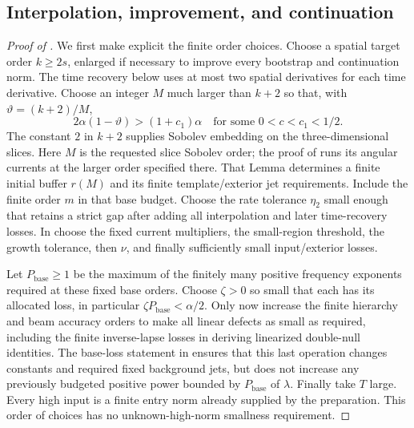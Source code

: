 \subsection{Interpolation, improvement, and continuation}

\begin{proof}[Proof of ]
We first make explicit the finite order choices.  Choose a spatial
target order $k\ge2s$, enlarged if necessary to improve every
bootstrap and continuation norm.  The time recovery below uses at
most two spatial derivatives for each time derivative.  Choose an
integer $M$ much larger
than $k+2$ so that, with $\vartheta=(k+2)/M$,
\begin{equation}\label{dn:interpolation-choice}
             2\alpha(1-\vartheta)>(1+c_1)\alpha
                         \quad\text{for some }0<c<c_1<1/2.
\end{equation}
The constant $2$ in $k+2$ supplies Sobolev embedding on the
three-dimensional slices.  Here $M$ is the requested slice Sobolev
order; the proof of  runs its angular
currents at the larger order specified there.  That Lemma determines
a finite initial buffer $r(M)$ and its finite template/exterior
jet requirements.  Include the finite order $m$ in that base
budget.  Choose the rate tolerance $\eta_2$ small enough that
 retains a strict gap after adding
all interpolation and later time-recovery losses.  In
 choose the fixed current multipliers,
the small-region threshold, the growth tolerance, then $\nu$, and
finally sufficiently small input/exterior losses.

Let $P_{\mathrm{base}}\ge1$ be the maximum of the finitely many
positive frequency exponents required at these fixed base orders.
Choose $\zeta>0$ so small that each has its allocated loss, in
particular $\zeta P_{\mathrm{base}}<\alpha/2$. Only now increase the
finite hierarchy and beam accuracy orders to make all linear
defects as small as required, including the finite inverse-lapse
losses in deriving linearized double-null identities.  The
base-loss statement in  ensures
that this last operation changes constants and required fixed
background jets, but does not increase any previously budgeted
positive power bounded by $P_{\mathrm{base}}$ of $\lambda$.
Finally take $T$ large.
Every high input is a finite entry norm already supplied by the
preparation.  This order of choices has no unknown-high-norm
smallness requirement.


\end{proof}
